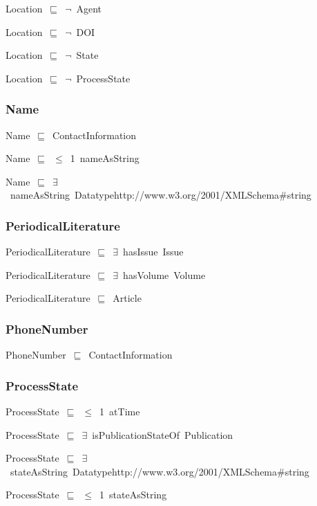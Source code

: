 \documentclass{article}
\begin{document}
Location~\ensuremath{\sqsubseteq}~\ensuremath{\lnot}~Agent

Location~\ensuremath{\sqsubseteq}~\ensuremath{\lnot}~DOI

Location~\ensuremath{\sqsubseteq}~\ensuremath{\lnot}~State

Location~\ensuremath{\sqsubseteq}~\ensuremath{\lnot}~ProcessState

\subsubsection*{Name}

Name~\ensuremath{\sqsubseteq}~ContactInformation~

Name~\ensuremath{\sqsubseteq}~\ensuremath{\leq}~1~nameAsString~

Name~\ensuremath{\sqsubseteq}~\ensuremath{\exists}~nameAsString~Datatypehttp://www.w3.org/2001/XMLSchema#string~

\subsubsection*{PeriodicalLiterature}

PeriodicalLiterature~\ensuremath{\sqsubseteq}~\ensuremath{\exists}~hasIssue~Issue~

PeriodicalLiterature~\ensuremath{\sqsubseteq}~\ensuremath{\exists}~hasVolume~Volume~

PeriodicalLiterature~\ensuremath{\sqsubseteq}~Article~

\subsubsection*{PhoneNumber}

PhoneNumber~\ensuremath{\sqsubseteq}~ContactInformation~

\subsubsection*{ProcessState}

ProcessState~\ensuremath{\sqsubseteq}~\ensuremath{\leq}~1~atTime~

ProcessState~\ensuremath{\sqsubseteq}~\ensuremath{\exists}~isPublicationStateOf~Publication~

ProcessState~\ensuremath{\sqsubseteq}~\ensuremath{\exists}~stateAsString~Datatypehttp://www.w3.org/2001/XMLSchema#string~

ProcessState~\ensuremath{\sqsubseteq}~\ensuremath{\leq}~1~stateAsString~
\end{document}
